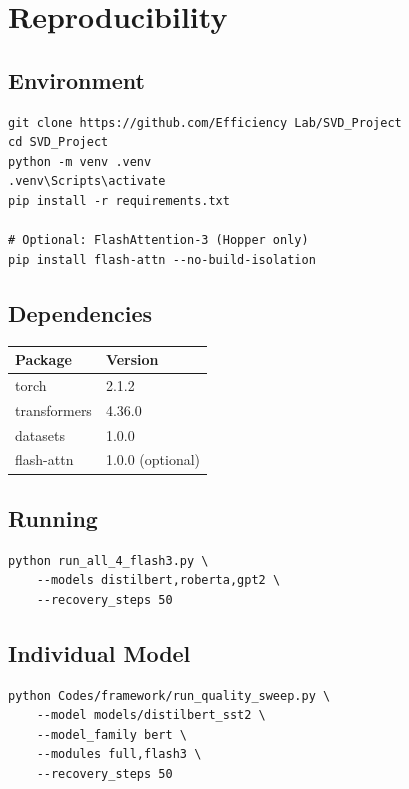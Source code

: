 \section{Reproducibility}

\subsection{Environment}

\begin{lstlisting}
git clone https://github.com/Efficiency Lab/SVD_Project
cd SVD_Project
python -m venv .venv
.venv\Scripts\activate
pip install -r requirements.txt

# Optional: FlashAttention-3 (Hopper only)
pip install flash-attn --no-build-isolation
\end{lstlisting}

\subsection{Dependencies}

\begin{table}[H]
\centering
\small
\begin{tabular}{ll}
\toprule
\textbf{Package} & \textbf{Version} \\
\midrule
torch & 2.1.2 \\
transformers & 4.36.0 \\
datasets & 1.0.0 \\
flash-attn & 1.0.0 (optional) \\
\bottomrule
\end{tabular}
\end{table}

\subsection{Running}

\begin{lstlisting}
python run_all_4_flash3.py \
    --models distilbert,roberta,gpt2 \
    --recovery_steps 50
\end{lstlisting}

\subsection{Individual Model}

\begin{lstlisting}
python Codes/framework/run_quality_sweep.py \
    --model models/distilbert_sst2 \
    --model_family bert \
    --modules full,flash3 \
    --recovery_steps 50
\end{lstlisting}

